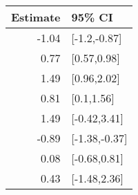\begin{tabular}{rl}
  \hline
Estimate & 95\% CI \\ 
  \hline
-1.04 & [-1.2,-0.87] \\ 
  0.77 & [0.57,0.98] \\ 
  1.49 & [0.96,2.02] \\ 
  0.81 & [0.1,1.56] \\ 
  1.49 & [-0.42,3.41] \\ 
  -0.89 & [-1.38,-0.37] \\ 
  0.08 & [-0.68,0.81] \\ 
  0.43 & [-1.48,2.36] \\ 
   \hline
\end{tabular}

